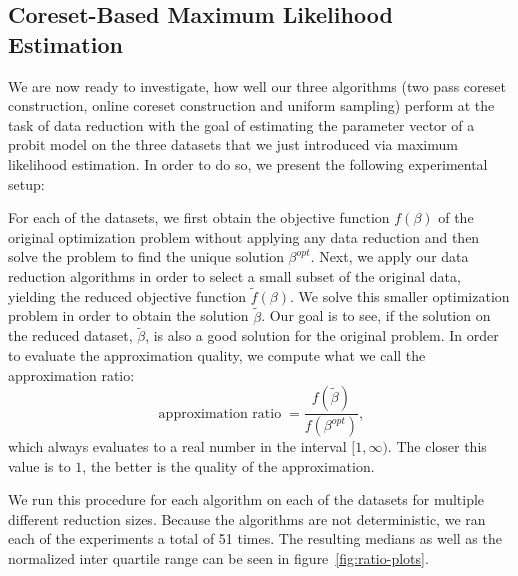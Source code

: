 \subsection{Coreset-Based Maximum Likelihood Estimation}

We are now ready to investigate, how well our three algorithms
(two pass coreset construction, online coreset construction and
uniform sampling) perform at the task of data reduction
with the goal of estimating the
parameter vector of a probit model on the three datasets that
we just introduced via maximum likelihood estimation.
In order to do so, we present the following experimental setup:

For each of the datasets, we first obtain the objective function
$f(\beta)$ of the original optimization problem without applying
any data reduction and then solve the problem to find the
unique solution $\beta^{opt}$.
Next, we apply our data reduction algorithms in order to select
a small subset of the original data, yielding the reduced
objective function $\tilde{f}(\beta)$. We solve this
smaller optimization problem in order to obtain the solution
$\tilde{\beta}$. Our goal is to see, if the solution on the
reduced dataset, $\tilde{\beta}$, is also a good solution
for the original problem. In order to evaluate the approximation
quality, we compute what we call the approximation ratio:
\begin{equation*}
    \operatorname{approximation\ ratio} = \frac{f(\tilde{\beta})}{f(\beta^{opt})},
\end{equation*}
which always evaluates to a real number in the interval $[1, \infty)$.
The closer this value is to $1$, the better is the quality of
the approximation.

We run this procedure for each algorithm on each of the datasets
for multiple different reduction sizes. Because the algorithms
are not deterministic, we ran each of the experiments a total
of 51 times. The resulting medians as well as the normalized
inter quartile range can be seen in figure~\ref{fig:ratio-plots}.

